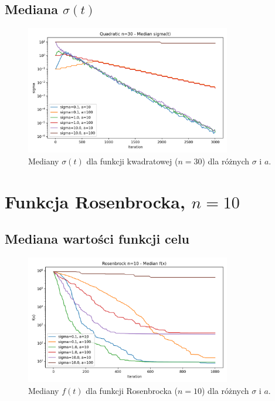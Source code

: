 \documentclass[a4paper,12pt]{article}
\begin{document}
\subsection{Mediana $\sigma(t)$}
\begin{figure}[H]
    \centering
    \includegraphics[width=0.8\textwidth]{charts/Quadratic_n30_all_sigmas.png}
    \caption{Mediany $\sigma(t)$ dla funkcji kwadratowej ($n=30$) dla różnych $\sigma$ i $a$.}
\end{figure}

\section{Funkcja Rosenbrocka, $n=10$}
\subsection{Mediana wartości funkcji celu}
\begin{figure}[H]
    \centering
    \includegraphics[width=0.8\textwidth]{charts/Rosenbrock_n10_all_medians.png}
    \caption{Mediany $f(t)$ dla funkcji Rosenbrocka ($n=10$) dla różnych $\sigma$ i $a$.}
\end{figure}
\end{document}
